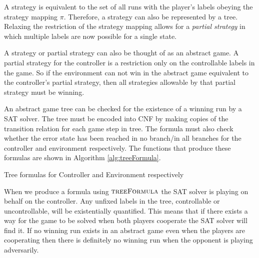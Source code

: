 \documentclass{llncs}
\begin{document}
A strategy is equivalent to the set of all runs with the player's labels
obeying the strategy mapping $\pi$. Therefore, a strategy can also be
represented by a tree. Relaxing the restriction of the strategy mapping allows
for a \emph{partial strategy} in which multiple labels are now possible for a
single state.

A strategy or partial strategy can also be thought of as an abstract game. A
partial strategy for the controller is a restriction only on the controllable
labels in the game. So if the environment can not win in the abstract game
equivalent to the controller's partial strategy, then all strategies allowable
by that partial strategy must be winning.

An abstract game tree can be checked for the existence of a winning run by a
SAT solver\cite{narodytska2014}.  The tree must be encoded into CNF by making
copies of the transition relation for each game step in tree. The formula must
also check whether the error state has been reached in no branch/in all
branches for the controller and environment respectively. The functions that
produce these formulas are shown in Algorithm \ref{alg:treeFormula}.

\begin{algorithm}
    \caption{Tree formulas for Controller and Environment respectively}
    \label{alg:treeFormula}
    \begin{algorithmic}
        \State {}
        \Else
        \State {}
        \EndIf
        \EndFunction
    \end{algorithmic}

    \begin{algorithmic}
        \State {}
        \Else
        \State {}
        \EndIf
        \EndFunction
    \end{algorithmic}
\end{algorithm}

When we produce a formula using $\textsc{treeFormula}$ the SAT solver is
playing on behalf on the controller. Any unfixed labels in the tree,
controllable or uncontrollable, will be existentially quantified.  This means
that if there exists a way for the game to be solved when both players
cooperate the SAT solver will find it. If no winning run exists in an abstract
game even when the players are cooperating then there is definitely no winning
run when the opponent is playing adversarily.
\end{document}
